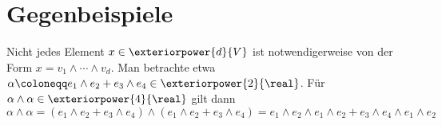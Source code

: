 \appendix


\section{Gegenbeispiele}

Nicht jedes Element $x \in \exteriorpower{d}{V}$ ist notwendigerweise von der Form $x = v_1 \wedge \dotsb \wedge v_d$.
Man betrachte etwa $\alpha \coloneqq e_1 \wedge e_2 + e_3 \wedge e_4 \in \exteriorpower{2}{\real}$.
Für $\alpha \wedge \alpha \in \exteriorpower{4}{\real}$ gilt dann
\[
    \alpha \wedge \alpha
  = (e_1 \wedge e_2 + e_3 \wedge e_4) \wedge (e_1 \wedge e_2 + e_3 \wedge e_4)
  = e_1 \wedge e_2 \wedge e_1 \wedge e_2 + e_3 \wedge e_4 \wedge e_1 \wedge e_2
\]